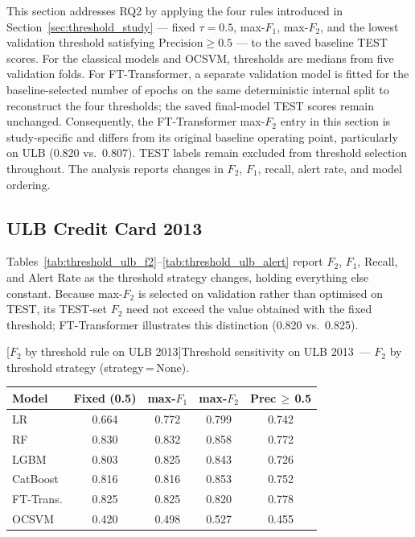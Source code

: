 This section addresses RQ2 by applying the four rules introduced in Section~\ref{sec:threshold_study} --- fixed $\tau = 0.5$, max-$F_1$, max-$F_2$, and the lowest validation threshold satisfying $\text{Precision} \geq 0.5$ --- to the saved baseline TEST scores. For the classical models and OCSVM, thresholds are medians from five validation folds. For FT-Transformer, a separate validation model is fitted for the baseline-selected number of epochs on the same deterministic internal split to reconstruct the four thresholds; the saved final-model TEST scores remain unchanged. Consequently, the FT-Transformer max-$F_2$ entry in this section is study-specific and differs from its original baseline operating point, particularly on ULB (0.820 vs.\ 0.807). TEST labels remain excluded from threshold selection throughout. The analysis reports changes in $F_2$, $F_1$, recall, alert rate, and model ordering.


\subsection{ULB Credit Card 2013}

Tables~\ref{tab:threshold_ulb_f2}--\ref{tab:threshold_ulb_alert} report $F_2$, $F_1$, Recall, and Alert Rate as the threshold strategy changes, holding everything else constant. Because max-$F_2$ is selected on validation rather than optimised on TEST, its TEST-set $F_2$ need not exceed the value obtained with the fixed threshold; FT-Transformer illustrates this distinction (0.820 vs.\ 0.825).

\noindent\begin{minipage}{\linewidth}\centering
{}[$F_2$ by threshold rule on ULB 2013]{Threshold sensitivity on ULB 2013~--- $F_2$ by threshold strategy (strategy\,=\,None).}
\label{tab:threshold_ulb_f2}
\begin{tabular}{l c c c c}
\toprule
Model & Fixed (0.5) & max-$F_1$ & max-$F_2$ & Prec\,$\geq$\,0.5 \\
\midrule
LR         & 0.664 & 0.772 & 0.799 & 0.742 \\
RF         & 0.830 & 0.832 & 0.858 & 0.772 \\
LGBM       & 0.803 & 0.825 & 0.843 & 0.726 \\
CatBoost   & 0.816 & 0.816 & 0.853 & 0.752 \\
FT-Trans.  & 0.825 & 0.825 & 0.820 & 0.778 \\
OCSVM      & 0.420 & 0.498 & 0.527 & 0.455 \\
\bottomrule
\end{tabular}
\end{minipage}

